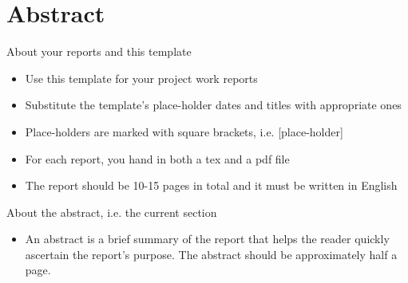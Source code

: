 \documentclass[Preamble]{subfiles}
\begin{document}
\chapter*{Abstract}

About your reports and this template
\begin{itemize}
\item Use this template for your project work reports
\item Substitute the template's place-holder dates and titles with appropriate ones
\item Place-holders are marked with square brackets, i.e. [place-holder]
\item For each report, you hand in both a tex and a pdf file
\item The report should be 10-15 pages in total and it must be written in English
\end{itemize}

About the abstract, i.e. the current section
\begin{itemize}
\item An abstract is a brief summary of the report that helps the
  reader quickly ascertain the report's purpose. The abstract should
  be approximately half a page.
\end{itemize}


\setcounter{tocdepth}{1}
\tableofcontents
\end{document}
